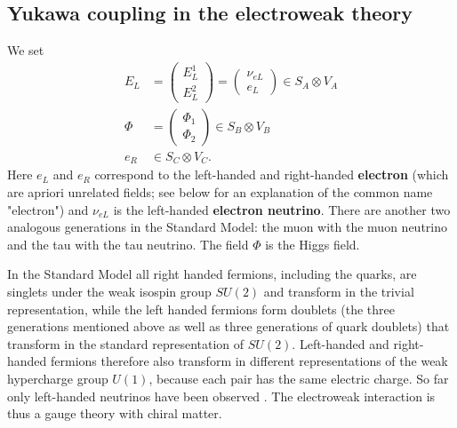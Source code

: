 \documentclass[11pt]{amsart}
\theoremstyle{definition}
\theoremstyle{remark}
\numberwithin{equation}{section}
\begin{document}
\subsection{Yukawa coupling in the electroweak theory}
We set
\begin{align*}
E_L&=\left(\begin{array}{c}E^1_L\\ E^2_L\end{array}\right)=\left(\begin{array}{c}\nu_{eL}\\ e_L\end{array}\right)\in S_A\otimes V_A\\
\Phi&=\left(\begin{array}{c}\Phi_1\\\Phi_2\end{array}\right)\in S_B\otimes V_B\\
e_R&\in S_C\otimes V_C.
\end{align*}
Here $e_L$ and $e_R$ correspond to the left-handed and right-handed {\bf electron} (which are apriori unrelated fields; see below for an explanation of the common name "{}electron"{}) and $\nu_{eL}$ is the left-handed {\bf electron neutrino}. There are another two analogous generations in the Standard Model: the muon with the muon neutrino and the tau with the tau neutrino. The field $\Phi$ is the Higgs field. 

In the Standard Model all right handed fermions, including the quarks, are singlets under the weak isospin group $SU(2)$ and transform in the trivial representation, while the left handed fermions form doublets (the three generations mentioned above as well as three generations of quark doublets) that transform in the standard representation of $SU(2)$. Left-handed and right-handed fermions therefore also transform in different representations of the weak hypercharge group $U(1)$, because each pair has the same electric charge. So far only left-handed neutrinos have been observed \cite{Drewes}. The electroweak interaction is thus a gauge theory with chiral matter.
\end{document}
